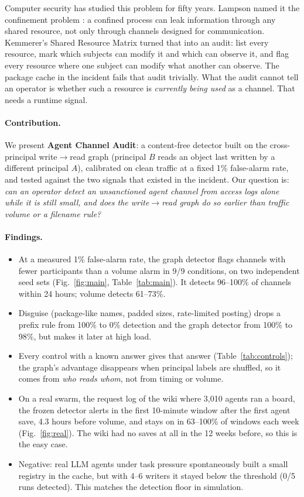 \documentclass[10pt]{article}
\newcommand{\wrr}{write$\to$read}
\begin{document}
Computer security has studied this problem for fifty years. Lampson named it the confinement problem \cite{lampson1973}: a confined process can leak information through any shared resource, not only through channels designed for communication. Kemmerer's Shared Resource Matrix \cite{kemmerer1983} turned that into an audit: list every resource, mark which subjects can modify it and which can observe it, and flag every resource where one subject can modify what another can observe. The package cache in the incident fails that audit trivially. What the audit cannot tell an operator is whether such a resource is \emph{currently being used} as a channel. That needs a runtime signal.

\paragraph{Contribution.} We present \textbf{Agent Channel Audit}: a content-free detector built on the cross-principal \wrr{} graph (principal $B$ reads an object last written by a different principal $A$), calibrated on clean traffic at a fixed 1\% false-alarm rate, and tested against the two signals that existed in the incident. Our question is: \emph{can an operator detect an unsanctioned agent channel from access logs alone while it is still small, and does the \wrr{} graph do so earlier than traffic volume or a filename rule?}

\paragraph{Findings.}
\begin{itemize}
\item At a measured 1\% false-alarm rate, the graph detector flags channels with fewer participants than a volume alarm in 9/9 conditions, on two independent seed sets (Fig.~\ref{fig:main}, Table~\ref{tab:main}). It detects 96--100\% of channels within 24 hours; volume detects 61--73\%.
\item Disguise (package-like names, padded sizes, rate-limited posting) drops a prefix rule from 100\% to 0\% detection and the graph detector from 100\% to 98\%, but makes it later at high load.
\item Every control with a known answer gives that answer (Table~\ref{tab:controls}); the graph's advantage disappears when principal labels are shuffled, so it comes from \emph{who reads whom}, not from timing or volume.
\item On a real swarm, the request log of the wiki where 3{,}010 agents ran a board, the frozen detector alerts in the first 10-minute window after the first agent save, 4.3 hours before volume, and stays on in 63--100\% of windows each week (Fig.~\ref{fig:real}). The wiki had no saves at all in the 12 weeks before, so this is the easy case.
\item Negative: real LLM agents under task pressure spontaneously built a small registry in the cache, but with 4--6 writers it stayed below the threshold (0/5 runs detected). This matches the detection floor in simulation.
\end{itemize}
\end{document}
